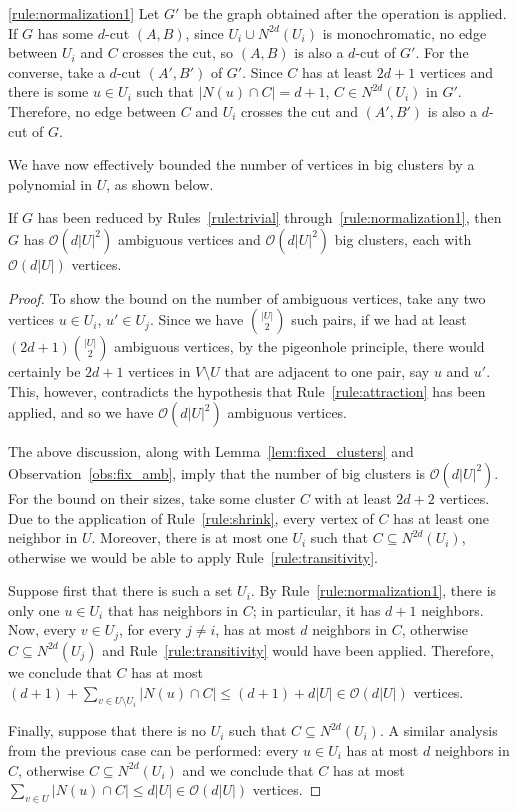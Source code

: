 \documentclass[a4paper,UKenglish,cleveref, autoref]{lipics-v2019}
\newcommand{\bigO}[1]{\mathcal{O}\!\left(#1\right)}
\begin{document}
\begin{sproof}{\ref{rule:normalization1}}
    Let $G'$ be the graph obtained after the operation is applied.
    If $G$ has some $d$-cut $(A,B)$, since $U_i \cup N^{2d}(U_i)$ is monochromatic, no edge between $U_i$ and $C$ crosses the cut, so $(A,B)$ is also a $d$-cut of $G'$.
    For the converse, take a $d$-cut $(A', B')$ of $G'$.
    Since $C$ has at least $2d+1$ vertices and there is some $u \in U_i$ such that $|N(u) \cap C| = d+1$, $C \in N^{2d}(U_i)$ in $G'$.
    Therefore, no edge between $C$ and $U_i$ crosses the cut and $(A', B')$ is also a $d$-cut of $G$.
\end{sproof}

We have now effectively bounded the number of vertices in big clusters by a polynomial in $U$, as shown below.

\begin{lemma}
    \label{lem:bound1}
    If $G$ has been reduced by Rules~\ref{rule:trivial} through~\ref{rule:normalization1}, then $G$ has $\bigO{d|U|^2}$ ambiguous vertices and $\bigO{d|U|^2}$ big clusters, each with $\bigO{d|U|}$ vertices.
\end{lemma}

\begin{proof}
    To show the bound on the number of ambiguous vertices, take any two vertices $u \in U_i$, $u' \in U_j$.
    Since we have $\binom{|U|}{2}$ such pairs, if we had at least $(2d + 1)\binom{|U|}{2}$ ambiguous vertices, by the pigeonhole principle, there would certainly be $2d+1$ vertices in $V \setminus U$ that are adjacent to one pair, say $u$ and $u'$.
    This, however, contradicts the hypothesis that Rule~\ref{rule:attraction} has been applied, and so we have $\bigO{d|U|^2}$ ambiguous vertices.

    The above discussion, along with Lemma~\ref{lem:fixed_clusters} and Observation~\ref{obs:fix_amb}, imply that the number of big clusters is $\bigO{d|U|^2}$.
    For the bound on their sizes, take some cluster $C$ with at least $2d + 2$ vertices.
    Due to the application of Rule~\ref{rule:shrink}, every vertex of $C$ has at least one neighbor in $U$.
    Moreover, there is at most one $U_i$ such that $C \subseteq N^{2d}(U_i)$, otherwise we would be able to apply Rule~\ref{rule:transitivity}.

    Suppose first that there is such a set $U_i$.
    By Rule~\ref{rule:normalization1}, there is only one $u \in U_i$ that has neighbors in $C$; in particular, it has $d+1$ neighbors.
    Now, every $v \in U_j$, for every $j\neq i$, has at most $d$ neighbors in $C$, otherwise $C \subseteq N^{2d}(U_j)$ and Rule~\ref{rule:transitivity} would have been applied.
    Therefore, we conclude that $C$ has at most $(d+1) +  \sum_{v \in U \setminus U_i} |N(u) \cap C| \leq (d+1) + d|U| \in \bigO{d|U|}$ vertices.

    Finally, suppose that there is no $U_i$ such that $C \subseteq N^{2d}(U_i)$.
    A similar analysis from the previous case can be performed: every $u \in U_i$ has at most $d$ neighbors in $C$, otherwise $C \subseteq N^{2d}(U_i)$ and we conclude that $C$ has at most $\sum_{v \in U} |N(u) \cap C| \leq d|U| \in \bigO{d|U|}$ vertices.
\end{proof}
\end{document}
